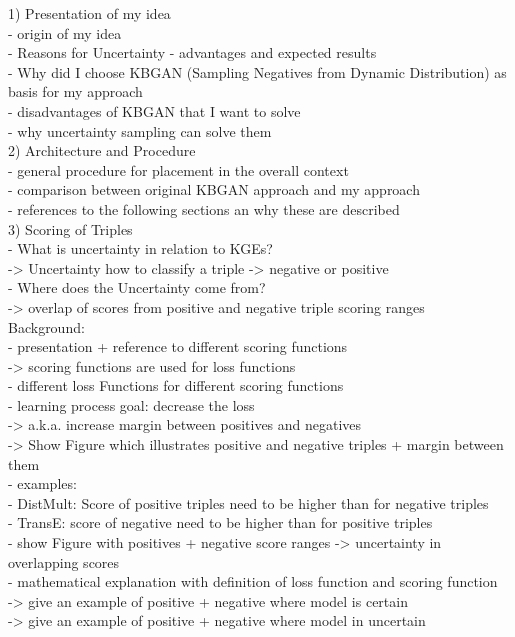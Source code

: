 1) Presentation of my idea\\
- origin of my idea\\
- Reasons for Uncertainty - advantages and expected results\\
- Why did I choose KBGAN (Sampling Negatives from Dynamic Distribution) as basis for my approach\\
- disadvantages of KBGAN that I want to solve\\
- why uncertainty sampling can solve them\\

2) Architecture and Procedure\\
- general procedure for placement in the overall context \\
- comparison between original KBGAN approach and my approach\\
- references to the following sections an why these are described\\

3) Scoring of Triples\\
- What is uncertainty in relation to KGEs?\\
-> Uncertainty how to classify a triple -> negative or positive\\
- Where does the Uncertainty come from?\\
-> overlap of scores from positive and negative triple scoring ranges\\
Background: \\
- presentation + reference to different scoring functions\\
-> scoring functions are used for loss functions\\
- different loss Functions for different scoring functions\\
- learning process goal: decrease the loss \\
-> a.k.a. increase margin between positives and negatives\\
-> Show Figure which illustrates positive and negative triples + margin between them\\
- examples:\\
    - DistMult: Score of positive triples need to be higher than for negative triples\\
    - TransE: score of negative need to be higher than for positive triples\\
- show Figure with positives + negative score ranges -> uncertainty in overlapping scores\\
- mathematical explanation with definition of loss function and scoring function\\
-> give an example of positive + negative where model is certain\\
-> give an example of positive + negative where model in uncertain\\\\

